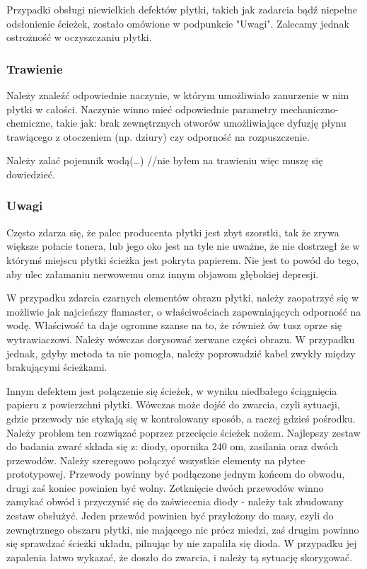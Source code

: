 Przypadki obsługi niewielkich defektów płytki, takich jak zadarcia bądź niepełne odsłonienie ścieżek, zostało omówione w podpunkcie "Uwagi". Zalecamy jednak ostrożność w oczyszczaniu płytki.

\subsubsection{Trawienie}

Należy znaleźć odpowiednie naczynie, w którym umożliwiało zanurzenie w nim płytki w całości. Naczynie winno mieć odpowiednie parametry mechaniczno-chemiczne, takie jak: brak zewnętrznych otworów umożliwiające dyfuzję płynu trawiącego z otoczeniem (np. dziury) czy odporność na rozpuszczenie.

Należy zalać pojemnik wodą(…)
//nie byłem na trawieniu więc muszę się dowiedzieć.

\subsubsection{Uwagi}

Często zdarza się, że palec producenta płytki jest zbyt szorstki, tak że zrywa większe połacie tonera, lub jego oko jest na tyle nie uważne, że nie dostrzegł że w którymś miejscu płytki ścieżka jest pokryta papierem. Nie  jest to powód do tego, aby ulec załamaniu nerwowemu oraz innym objawom głębokiej depresji.

W przypadku zdarcia czarnych elementów obrazu płytki, należy zaopatrzyć się w możliwie jak najcieńszy flamaster, o właściwościach zapewniających odporność na wodę. Właściwość ta daje ogromne szanse na to, że również ów tusz oprze się wytrawiaczowi. Należy wówczas dorysować zerwane części obrazu. W przypadku jednak, gdyby metoda ta nie pomogła, należy poprowadzić kabel zwykły między brakującymi ścieżkami. 

Innym defektem jest połączenie się ścieżek, w wyniku niedbałego ściągnięcia papieru z powierzchni płytki. Wówczas może dojść do zwarcia, czyli sytuacji, gdzie przewody nie stykają się w kontrolowany sposób, a raczej gdzieś pośrodku.  Należy problem ten rozwiązać poprzez przecięcie ścieżek nożem. Najlepszy zestaw do badania zwarć składa się z: diody, opornika 240 om, zasilania oraz dwóch przewodów. Należy szeregowo połączyć wszystkie elementy na płytce prototypowej. Przewody powinny być podłączone jednym końcem do obwodu, drugi zaś koniec powinien być wolny. Zetknięcie dwóch przewodów winno zamykać obwód i przyczynić się do zaświecenia diody - należy tak zbudowany zestaw obsłużyć. Jeden przewód powinien być przyłożony do masy, czyli do zewnętrznego obszaru płytki, nie mającego nic prócz miedzi, zaś drugim powinno się sprawdzać ścieżki układu, pilnując by nie zapaliła się dioda. W przypadku jej zapalenia łatwo wykazać, że doszło do zwarcia, i należy tą sytuację skorygować.
